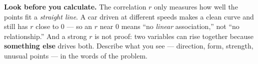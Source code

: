 \documentclass[12pt]{article}
\begin{document}
\vspace{0.14in}

\boxguard[8]
\begin{remindbox}
\small
\textbf{Look before you calculate.} The correlation $r$ only measures how well the points fit a
\emph{straight line}. A car driven at different speeds makes a clean curve and still has
$r$ close to 0 --- so an $r$ near 0 means ``no \emph{linear} association,'' not ``no
relationship.'' And a strong $r$ is not proof: two variables can rise together because
\textbf{something else} drives both. Describe what you see --- direction, form, strength,
unusual points --- in the words of the problem.
\end{remindbox}
\end{document}
